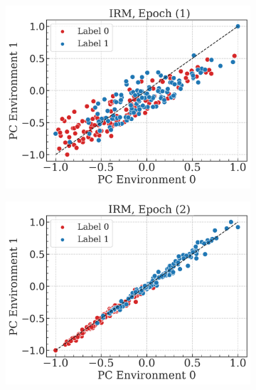 \begin{figure}[H]
    \begin{subfigure}[b]{0.32\textwidth}
        \centering
        \includegraphics[width=\textwidth]{img/results_discussion/datashift/L_1.png}
    \end{subfigure}
    \hfill
    \begin{subfigure}[b]{0.32\textwidth}
        \centering
        \includegraphics[width=\textwidth]{img/results_discussion/datashift/L_2.png}
    \end{subfigure}
    \hfill
    \begin{subfigure}[b]{0.32\textwidth}
        \centering

\end{subfigure}
\end{figure}
